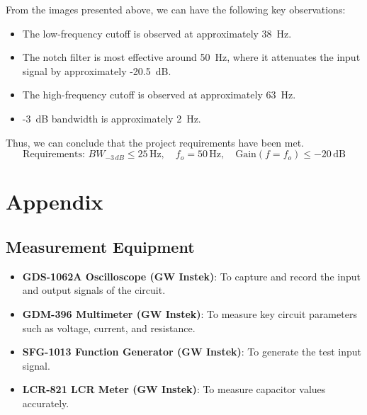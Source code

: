 \documentclass[hidelinks,12pt]{article}
\begin{document}
	From the images presented above, we can have the following key observations:
	
	\begin{itemize}
		\item The low-frequency cutoff is observed at approximately 38~Hz.
		\item The notch filter is most effective around 50~Hz, where it attenuates the input signal by approximately -20.5~dB.
		\item The high-frequency cutoff is observed at approximately 63~Hz.
		\item -3~dB bandwidth is approximately 2~Hz.
	\end{itemize}
	
	Thus, we can conclude that the project requirements have been met.
	\begin{equation}
		\text{Requirements: } BW_{-3 \, dB} \le 25 \, \text{Hz}, \quad f_o = 50 \, \text{Hz}, \quad \text{Gain}(f = f_o) \le -20 \, \text{dB}
	\end{equation}
	
	
	\section{Appendix}
	\subsection{Measurement Equipment}
	\begin{itemize}
		\item \textbf{GDS-1062A Oscilloscope (GW Instek)}: To capture and record the input and output signals of the circuit.
		
		\item \textbf{GDM-396 Multimeter (GW Instek)}: To measure key circuit parameters such as voltage, current, and resistance.
		
		\item \textbf{SFG-1013 Function Generator (GW Instek)}: To generate the test input signal.
		
		\item \textbf{LCR-821 LCR Meter (GW Instek)}: To measure capacitor values accurately.
	\end{itemize}
	
	
	
	
\end{document}
